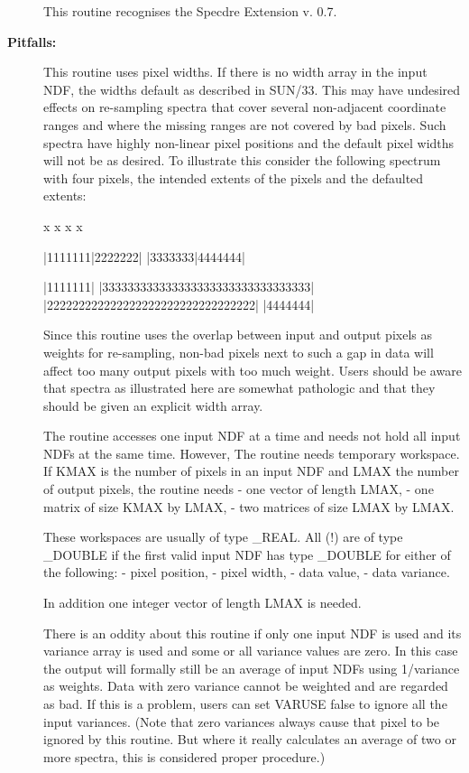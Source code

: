 \begin{description}
This routine recognises the Specdre Extension v. 0.7.

\item [{\bf Pitfalls:}]
   This routine uses pixel widths. If there is no width array in the
   input NDF, the widths default as described in SUN/33. This may
   have undesired effects on re-sampling spectra that cover several
   non-adjacent coordinate ranges and where the missing ranges are
   not covered by bad pixels. Such spectra have highly non-linear
   pixel positions and the default pixel widths will not be as
   desired. To illustrate this consider the following spectrum with
   four pixels, the intended extents of the pixels and the defaulted
   extents:

            x       x                         x       x

        |1111111|2222222|                 |3333333|4444444|

        |1111111|            |333333333333333333333333333333333|
   |222222222222222222222222222222222|            |4444444|

   Since this routine uses the overlap between input and output
   pixels as weights for re-sampling, non-bad pixels next to such a
   gap in data will affect too many output pixels with too much
   weight.
   Users should be aware that spectra as illustrated here are
   somewhat pathologic and that they should be given an explicit
   width array.

   The routine accesses one input NDF at a time and needs not hold
   all input NDFs at the same time. However, The routine needs
   temporary workspace. If KMAX is the number of pixels in an input
   NDF and LMAX the number of output pixels, the routine needs
   -  one vector of length LMAX,
   -  one matrix of size KMAX by LMAX,
   -  two matrices of size LMAX by LMAX.

   These workspaces are usually of type _REAL. All (!) are of type
   _DOUBLE if the first valid input NDF has type _DOUBLE for either
   of the following:
   -  pixel position,
   -  pixel width,
   -  data value,
   -  data variance.

   In addition one integer vector of length LMAX is needed.

   There is an oddity about this routine if only one input NDF is
   used and its variance array is used and some or all variance
   values are zero. In this case the output will formally still be an
   average of input NDFs using 1/variance as weights. Data with zero
   variance cannot be weighted and are regarded as bad. If this is a
   problem, users can set VARUSE false to ignore all the input
   variances. (Note that zero variances always cause that pixel to be
   ignored by this routine. But where it really calculates an average
   of two or more spectra, this is considered proper procedure.)


\end{description}
